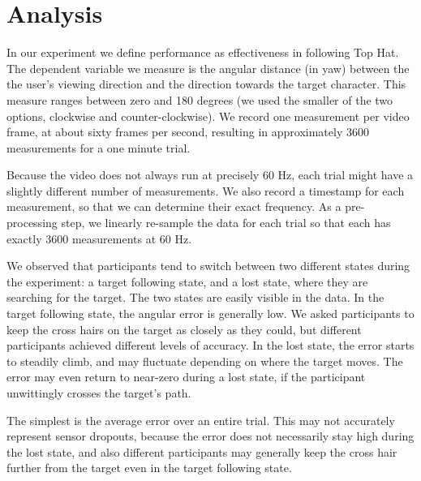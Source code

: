 \documentclass{acmsiggraph}                     %
\begin{document}
\section{Analysis}

In our experiment we define performance as effectiveness in following Top Hat.  The dependent variable we measure is the angular distance (in yaw) between the the user's viewing direction and the direction towards the target character.  This measure ranges between zero and 180 degrees (we used the smaller of the two options, clockwise and counter-clockwise).  We record one measurement per video frame, at about sixty frames per second, resulting in approximately 3600 measurements for a one minute trial.

Because the video does not always run at precisely 60 Hz, each trial might have a slightly different number of measurements.  We also record a timestamp for each measurement, so that we can determine their exact frequency.  As a pre-processing step, we linearly re-sample the data for each trial so that each has exactly 3600 measurements at 60 Hz.

We observed that participants tend to switch between two different states during the experiment: a target following state, and a lost state, where they are searching for the target.  The two states are easily visible in the data.  In the target following state, the angular error is generally low.  We asked participants to keep the cross hairs on the target as closely as they could, but different participants achieved different levels of accuracy.  In the lost state, the error starts to steadily climb, and may fluctuate depending on where the target moves.  The error may even return to near-zero during a lost state, if the participant unwittingly crosses the target's path.



The simplest is the average error over an entire trial.  This may not accurately represent sensor dropouts, because the error does not necessarily stay high during the lost state, and also different participants may generally keep the cross hair further from the target even in the target following state.
\end{document}
